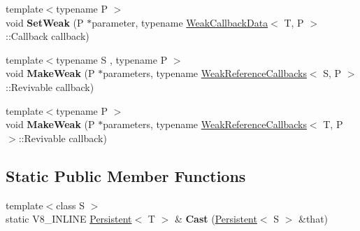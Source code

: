 \begin{DoxyCompactItemize}
\item 
\hypertarget{classv8_1_1_persistent_af7837e06a2fbed3bdb2cc83f3b953ec7}{}{\footnotesize template$<$typename P $>$ }\\void {\bfseries Set\+Weak} (P $\ast$parameter, typename \hyperlink{classv8_1_1_weak_callback_data}{Weak\+Callback\+Data}$<$ T, P $>$\+::Callback callback)\label{classv8_1_1_persistent_af7837e06a2fbed3bdb2cc83f3b953ec7}

\item 
\hypertarget{classv8_1_1_persistent_a1e2ceceaf6e18ed4616ea615c85799f2}{}{\footnotesize template$<$typename S , typename P $>$ }\\void {\bfseries Make\+Weak} (P $\ast$parameters, typename \hyperlink{classv8_1_1_weak_reference_callbacks}{Weak\+Reference\+Callbacks}$<$ S, P $>$\+::Revivable callback)\label{classv8_1_1_persistent_a1e2ceceaf6e18ed4616ea615c85799f2}

\item 
\hypertarget{classv8_1_1_persistent_a18dd2d8619071744e08a98ddd9308df3}{}{\footnotesize template$<$typename P $>$ }\\void {\bfseries Make\+Weak} (P $\ast$parameters, typename \hyperlink{classv8_1_1_weak_reference_callbacks}{Weak\+Reference\+Callbacks}$<$ T, P $>$\+::Revivable callback)\label{classv8_1_1_persistent_a18dd2d8619071744e08a98ddd9308df3}

\end{DoxyCompactItemize}
\subsection*{Static Public Member Functions}
\begin{DoxyCompactItemize}
\item 
\hypertarget{classv8_1_1_persistent_aa20fd9af0b410df9e887689ef97c28dd}{}{\footnotesize template$<$class S $>$ }\\static V8\+\_\+\+I\+N\+L\+I\+N\+E \hyperlink{classv8_1_1_persistent}{Persistent}$<$ T $>$ \& {\bfseries Cast} (\hyperlink{classv8_1_1_persistent}{Persistent}$<$ S $>$ \&that)\label{classv8_1_1_persistent_aa20fd9af0b410df9e887689ef97c28dd}

\end{DoxyCompactItemize}
